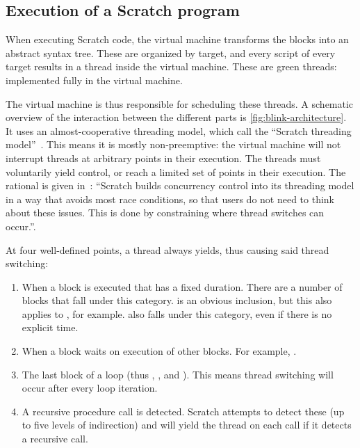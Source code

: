 \documentclass[../main]{subfiles}
\begin{document}
\subsection{Execution of a Scratch program}\label{subsec:execution-of-a-scratch-program}

When executing Scratch code, the virtual machine transforms the blocks into an abstract syntax tree.
These are organized by target, and every script of every target results in a thread inside the virtual machine.
These are green threads: implemented fully in the virtual machine.

The virtual machine is thus responsible for scheduling these threads.
A schematic overview of the interaction between the different parts is \cref{fig:blink-architecture}.
It uses an almost-cooperative threading model, which \citeauthor{maloneyScratchProgrammingLanguage2010a} call the ``Scratch threading model''~\autocite{maloneyScratchProgrammingLanguage2010a}.
This means it is mostly non-preemptive: the virtual machine will not interrupt threads at arbitrary points in their execution.
The threads must voluntarily yield control, or reach a limited set of points in their execution.
The rational is given in~\autocite{maloneyScratchProgrammingLanguage2010a}: ``Scratch builds concurrency control into its threading model in a way that avoids most race conditions, so that users do not need to think about these issues.
This is done by constraining where thread switches can occur.''.

At four well-defined points, a thread always yields, thus causing said thread switching:
\begin{enumerate}
    \item When a block is executed that has a fixed duration.
        There are a number of blocks that fall under this category.
         is an obvious inclusion, but this also applies to , for example.
         also falls under this category, even if there is no explicit time.
    \item When a block waits on execution of other blocks.
        For example, .
    \item The last block of a loop (thus , , and ).
        This means thread switching will occur after every loop iteration.
    \item A recursive procedure call is detected.
        Scratch attempts to detect these (up to five levels of indirection) and will yield the thread on each call if it detects a recursive call.
\end{enumerate}
\end{document}
